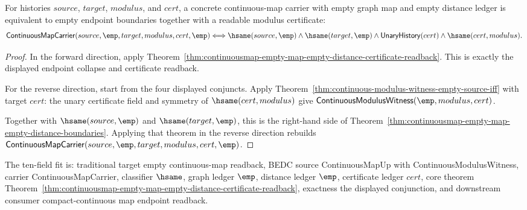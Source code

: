 \begin{theorem}
\label{thm:continuousmap-empty-map-empty-distance-certificate-exactness}
For histories $source$, $target$, $modulus$, and $cert$, a concrete
continuous-map carrier with empty graph map and empty distance ledger is
equivalent to empty endpoint boundaries together with a readable modulus
certificate:
$$
\mathsf{ContinuousMapCarrier}(source,\emp,target,modulus,cert,\emp)
\Longleftrightarrow
\hsame(source,\emp)\land\hsame(target,\emp)\land
\mathsf{UnaryHistory}(cert)\land\hsame(cert,modulus).
$$
\end{theorem}
\begin{proof}
In the forward direction, apply
Theorem~\ref{thm:continuousmap-empty-map-empty-distance-certificate-readback}.
This is exactly the displayed endpoint collapse and certificate readback.

For the reverse direction, start from the four displayed conjuncts. Apply
Theorem~\ref{thm:continuous-modulus-witness-empty-source-iff} with target
$cert$: the unary certificate field and symmetry of $\hsame(cert,modulus)$ give
$\mathsf{ContinuousModulusWitness}(\emp,modulus,cert)$.

Together with $\hsame(source,\emp)$ and $\hsame(target,\emp)$, this is the
right-hand side of
Theorem~\ref{thm:continuousmap-empty-map-empty-distance-boundaries}. Applying
that theorem in the reverse direction rebuilds
$\mathsf{ContinuousMapCarrier}(source,\emp,target,modulus,cert,\emp)$.
\end{proof}

The ten-field fit is: traditional target empty continuous-map readback, BEDC
source ContinuousMapUp with ContinuousModulusWitness, carrier
ContinuousMapCarrier, classifier $\hsame$, graph ledger $\emp$, distance ledger
$\emp$, certificate ledger $cert$, core theorem
Theorem~\ref{thm:continuousmap-empty-map-empty-distance-certificate-readback},
exactness the displayed conjunction, and downstream consumer compact-continuous
map endpoint readback.

